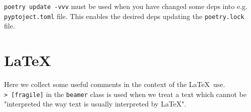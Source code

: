 \documentclass[11pt]{article}
\newcommand{\cmd}[1]{\colorbox{light-gray}{\textcolor{gio}{\texttt{#1}}}}
\begin{document}
\begin{multicols}{2}
\cmd{poetry update -vvv} must be used when you have changed some deps into e.g. \texttt{pyptoject.toml} file. This enables the desired deps updating the \texttt{poetry.lock} file.

\section{\LaTeX}

Here we collect some useful comments in the context of the \LaTeX$\,$ use. \\

\cmd{> [fragile]} in the \texttt{beamer} class is used when we treat a text which cannot be "interpreted the way text is usually interpreted by \LaTeX".


\newpage
\end{multicols}
\end{document}

